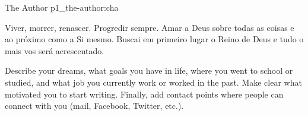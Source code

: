 


\begin{chapterpage}{
	{The Author}
}{p1_the-author:cha}

\vspace*{\fill}

\begin{center}


\end{center}
\vspace*{\fill}

\begin{myquotation} Viver, morrer, renascer. Progredir sempre. Amar a Deus sobre todas as coisas e ao próximo como a Si mesmo. Buscai em primeiro lugar o Reino de Deus e tudo o mais vos será acrescentado.\end{myquotation}

\end{chapterpage}

Describe your dreams, what goals you have in life, where you went to school or studied, and what job you currently work or worked in the past. Make clear what motivated you to start writing. Finally, add contact points where people can connect with you (mail, Facebook, Twitter, etc.). 
